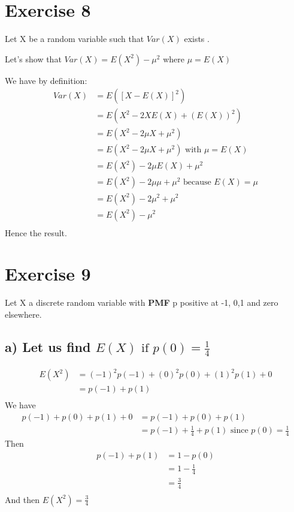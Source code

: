 \documentclass[11pt]{article}
\begin{document}
     
\newpage 
    \section{Exercise 8}
Let X be a random variable such that $Var(X)$ exists .


Let's show that 
$Var(X)=E(X^2)-\mu^2$  where $\mu=E(X)$ 

We have by definition:
\begin{align*}
    Var(X) &= E([X-E(X)]^2) \\
           &= E(X^2-2XE(X)+(E(X))^2) \\
           &= E(X^2-2\mu X+\mu^2) \\
           &= E(X^2-2\mu X+\mu^2)\text{ with } \mu=E(X) \\           
           &=  E(X^2)-2\mu E(X)+\mu^2\\      
           &=  E(X^2)-2\mu\mu+\mu^2\text{ because } E(X)=\mu \\  
           &=  E(X^2)-2\mu^2+\mu^2 \\
           &=  E(X^2)-\mu^2 \\                                    
\end{align*}
Hence the result.



\newpage 
    \section{Exercise 9}
    Let X a discrete random variable with \textbf{PMF} p positive at -1, 0,1 and zero elsewhere.
    \subsection{a) Let us find $E(X) \text{ if } p(0)=\frac{1}{4}$}
 \begin{align*}
  E(X^2) &= (-1)^2p(-1)+(0)^2p(0)+(1)^2p(1)+0 \\
       &=p(-1)+p(1) \\       
\end{align*}   
We have
\begin{align*}
  p(-1)+p(0)+p(1)+0 &= p(-1)+p(0)+p(1)\\ 
  					&= p(-1)+\frac{1}{4}+p(1)      \text{ since } p(0)= \frac{1}{4}
\end{align*}
Then 
 \begin{align*}
  p(-1)+p(1) &= 1-p(0)\\ 
  			&= 1-\frac{1}{4}\\
  			&= \frac{3}{4}\\
\end{align*} 
And then $E(X^2)=\frac{3}{4}$ 
\end{document}
